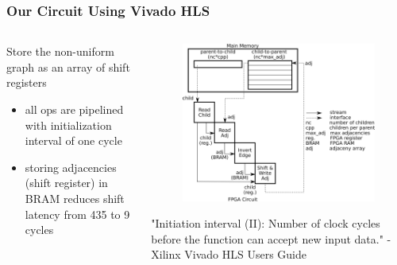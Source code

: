 \documentclass{beamer}
\begin{document}
\begin{frame}
  \frametitle{Our Circuit Using Vivado HLS}
  \begin{columns}
    \begin{column}{0.35\textwidth}
      Store the non-uniform graph as an array of shift registers
      \begin{itemize}
        \item all ops are pipelined with initialization interval of one cycle
        \item storing adjacencies (shift register) in BRAM reduces shift latency from 435 to 9 cycles
      \end{itemize}
    \end{column}
    \begin{column}{0.6\textwidth}
      \begin{figure}
        \centering
        \includegraphics[width=\textwidth]{figures/invert.png}
      \end{figure}
      {\tiny "Initiation interval (II): Number of clock cycles before the function can accept new input data." - Xilinx Vivado HLS Users Guide}
    \end{column}
  \end{columns}
\end{frame}
\end{document}
